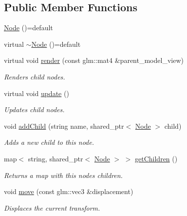 \subsection*{Public Member Functions}
\begin{DoxyCompactItemize}
\item 
\mbox{\hyperlink{classoglsl_1_1_node_a485089d967532e58ecb6eaa1bcbb1185}{Node}} ()=default
\item 
virtual \mbox{\hyperlink{classoglsl_1_1_node_a45566d6c50af1f1676f0f11d3ef2b715}{$\sim$\+Node}} ()=default
\item 
virtual void \mbox{\hyperlink{classoglsl_1_1_node_a09545b18a2d798327601a6251c091444}{render}} (const glm\+::mat4 \&parent\+\_\+model\+\_\+view)
\begin{DoxyCompactList}\small\item\em Renders child nodes. \end{DoxyCompactList}\item 
virtual void \mbox{\hyperlink{classoglsl_1_1_node_af0c785449427102ed6922ea82e994577}{update}} ()
\begin{DoxyCompactList}\small\item\em Updates child nodes. \end{DoxyCompactList}\item 
void \mbox{\hyperlink{classoglsl_1_1_node_a2429fc76cc11f2b67a9161dc12517bab}{add\+Child}} (string name, shared\+\_\+ptr$<$ \mbox{\hyperlink{classoglsl_1_1_node}{Node}} $>$ child)
\begin{DoxyCompactList}\small\item\em Adds a new child to this node. \end{DoxyCompactList}\item 
map$<$ string, shared\+\_\+ptr$<$ \mbox{\hyperlink{classoglsl_1_1_node}{Node}} $>$ $>$ \mbox{\hyperlink{classoglsl_1_1_node_a7f3fb74d9bb97e2bc5f20ba75fbfa1e6}{get\+Children}} ()
\begin{DoxyCompactList}\small\item\em Returns a map with this node\textquotesingle{}s children. \end{DoxyCompactList}\item 
void \mbox{\hyperlink{classoglsl_1_1_node_a69b0ce077cfafe57a573a65299440949}{move}} (const glm\+::vec3 \&displacement)
\begin{DoxyCompactList}\small\item\em Displaces the current transform. \end{DoxyCompactList}\item 

\end{DoxyCompactItemize}
